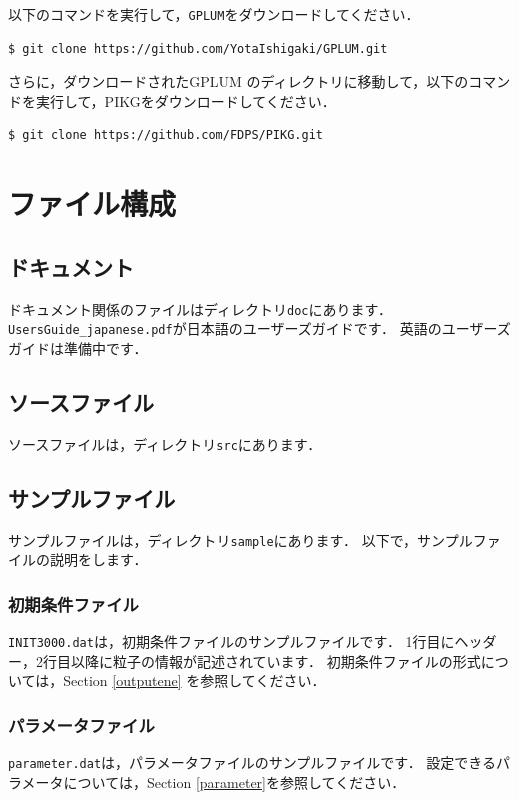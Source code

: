 \documentclass[12pt,a4paper,dvipdfmx]{jsarticle}
\newcommand{\ourcode}{GPLUM\xspace}
\begin{document}
以下のコマンドを実行して，\texttt{\ourcode}をダウンロードしてください．
\begin{verbatim}
$ git clone https://github.com/YotaIshigaki/GPLUM.git
\end{verbatim}

さらに，ダウンロードされた\ourcode のディレクトリに移動して，以下のコマンドを実行して，PIKGをダウンロードしてください．
\begin{verbatim}
$ git clone https://github.com/FDPS/PIKG.git
\end{verbatim}


\section{ファイル構成}

\subsection{ドキュメント}
ドキュメント関係のファイルはディレクトリ\texttt{doc}にあります．
\texttt{UsersGuide\_japanese.pdf}が日本語のユーザーズガイドです．
英語のユーザーズガイドは準備中です．

\subsection{ソースファイル}
ソースファイルは，ディレクトリ\texttt{src}にあります．

\subsection{サンプルファイル}
サンプルファイルは，ディレクトリ\texttt{sample}にあります．
以下で，サンプルファイルの説明をします．
\subsubsection{初期条件ファイル}
\texttt{INIT3000.dat}は，初期条件ファイルのサンプルファイルです．
1行目にヘッダー，2行目以降に粒子の情報が記述されています．
初期条件ファイルの形式については，Section \ref{outputene} を参照してください．

\subsubsection{パラメータファイル}
\texttt{parameter.dat}は，パラメータファイルのサンプルファイルです．
設定できるパラメータについては，Section \ref{parameter}を参照してください．
\end{document}
